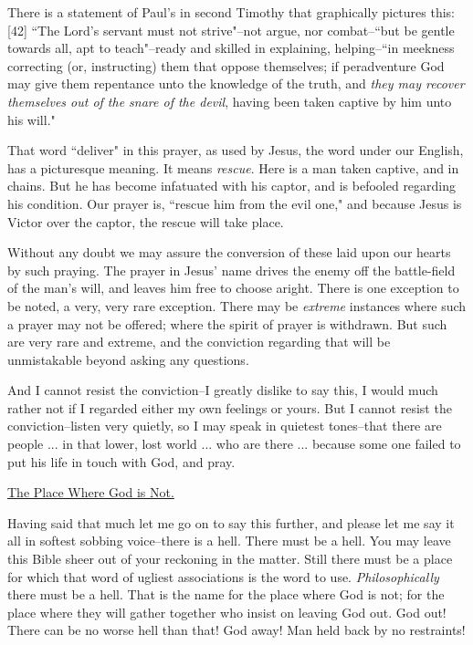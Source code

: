 There is a statement of Paul's in second Timothy that graphically pictures
this:[42] ``The Lord's servant must not strive"--not argue, nor
combat--``but be gentle towards all, apt to teach"--ready and skilled in
explaining, helping--``in meekness correcting (or, instructing) them that
oppose themselves; if peradventure God may give them repentance unto the
knowledge of the truth, and \textit{they may recover themselves out of the snare
of the devil}, having been taken captive by him unto his will."

That word ``deliver" in this prayer, as used by Jesus, the word under our
English, has a picturesque meaning. It means \textit{rescue}. Here is a man taken
captive, and in chains. But he has become infatuated with his captor, and
is befooled regarding his condition. Our prayer is, ``rescue him from the
evil one," and because Jesus is Victor over the captor, the rescue will
take place.

Without any doubt we may assure the conversion of these laid upon our
hearts by such praying. The prayer in Jesus' name drives the enemy off the
battle-field of the man's will, and leaves him free to choose aright.
There is one exception to be noted, a very, very rare exception. There may
be \textit{extreme} instances where such a prayer may not be offered; where the
spirit of prayer is withdrawn. But such are very rare and extreme, and the
conviction regarding that will be unmistakable beyond asking any
questions.

And I cannot resist the conviction--I greatly dislike to say this, I would
much rather not if I regarded either my own feelings or yours. But I
cannot resist the conviction--listen very quietly, so I may speak in
quietest tones--that there are people ... in that lower, lost world ...
who are there ... because some one failed to put his life in touch with
God, and pray.



\underline{The Place Where God is Not.}


Having said that much let me go on to say this further, and please let me
say it all in softest sobbing voice--there is a hell. There must be a
hell. You may leave this Bible sheer out of your reckoning in the matter.
Still there must be a place for which that word of ugliest associations is
the word to use. \textit{Philosophically} there must be a hell. That is the name
for the place where God is not; for the place where they will gather
together who insist on leaving God out. God out! There can be no worse
hell than that! God away! Man held back by no restraints!

